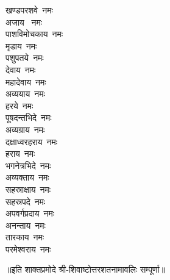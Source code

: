 \begin{multicols}{2}
\begin{flushleft}
खण्डपरशवे~नमः\\
अजाय ~नमः\\
पाशविमोचकाय~नमः\hfill{}\\
मृडाय~नमः\\
पशुपतये~नमः\\
देवाय~नमः\\
महादेवाय~नमः\\
अव्ययाय~नमः\\
हरये~नमः\\
पूषदन्तभिदे~नमः\\
अव्यग्राय~नमः\\
दक्षाध्वरहराय~नमः\\
हराय~नमः\hfill{}\\
भगनेत्रभिदे~नमः\\
अव्यक्ताय~नमः\\
सहस्राक्षाय~नमः\\
सहस्रपदे~नमः\\
अपवर्गप्रदाय~नमः\\
अनन्ताय~नमः\\
तारकाय~नमः\\
परमेश्वराय~नमः\\
\end{flushleft}
\end{multicols}
॥इति शाक्तप्रमोदे श्री-शिवाष्टोत्तरशतनामावलिः सम्पूर्णा॥
